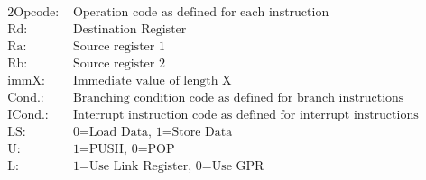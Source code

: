 \hspace{0pt}\\\\

\begingroup
\setlength{\abovedisplayskip}{0pt}
 \\
\begin{alignat*}{2}
	\text{Opcode:}& \text{ Operation code as defined for each instruction} \\
	\text{Rd:}& \text{ Destination Register} \\
	\text{Ra:}& \text{ Source register 1} \\
	\text{Rb:}& \text{ Source register 2} \\
	\text{immX:}& \text{ Immediate value of length X} \\
	\text{Cond.:}& \text{ Branching condition code as defined for branch instructions} \\
	\text{ICond.:}& \text{ Interrupt instruction code as defined for interrupt instructions} \\
	\text{LS:}& \text{ 0=Load Data, 1=Store Data} \\
	\text{U:}& \text{ 1=PUSH, 0=POP} \\
	\text{L:}& \text{ 1=Use Link Register, 0=Use GPR} \\
\end{alignat*}
\endgroup

